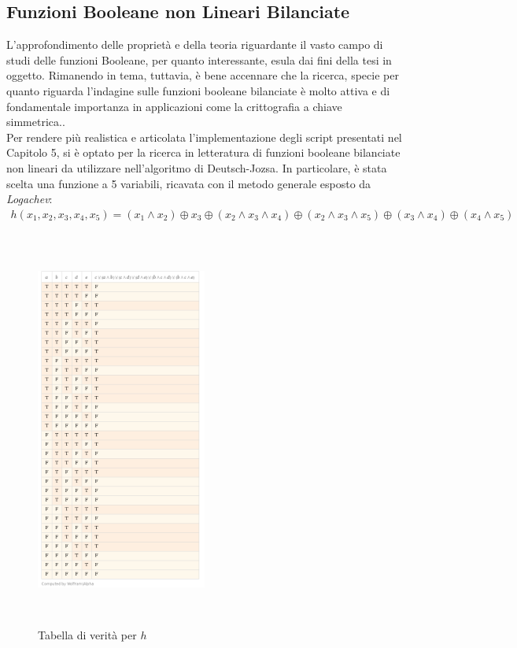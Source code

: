 \documentclass[12pt,a4paper,openright]{report}
\newcommand*\xor{\mathbin{\oplus}}
\begin{document}
\subsection{Funzioni Booleane non Lineari Bilanciate}
L'approfondimento delle proprietà e della teoria riguardante il vasto campo di studi delle funzioni Booleane, per quanto interessante, esula dai fini della tesi in oggetto.
Rimanendo in tema, tuttavia, è bene accennare che la ricerca, specie per quanto riguarda l'indagine sulle funzioni booleane bilanciate è molto attiva e di fondamentale importanza in applicazioni come la crittografia a chiave simmetrica.\cite{ref4}.\\
Per rendere più realistica e articolata l'implementazione degli script presentati nel Capitolo 5, si è optato per la ricerca in letteratura di funzioni booleane bilanciate non lineari
da utilizzare nell'algoritmo di Deutsch-Jozsa. In particolare, è stata scelta una funzione a 5 variabili, ricavata con il metodo generale esposto da \textit{Logachev}\cite{ref5}:
    \begin{align*}
            h(x_1, x_2, x_3, x_4, x_5)=(x_1 \land x_2) \xor x_3 \xor (x_2 \land x_3 \land x_4) \xor (x_2 \land x_3 \land x_5) \xor (x_3 \land x_4) \xor (x_4 \land x_5)
    \end{align*}



\begin{figure}[h]
     \centering
     \includegraphics[width=0.5\textwidth,height=13.1cm]{computedFBBtrueTable}
     \caption{Tabella di verità per $h$}
\end{figure}
    
\end{document}
